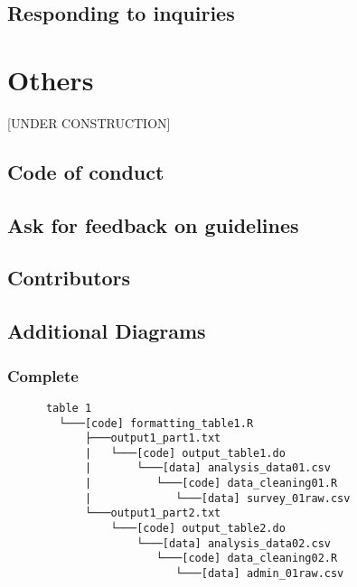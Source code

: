 \documentclass[]{book}
\begin{document}
\hypertarget{responding-to-inquiries}{%
\section{Responding to inquiries}\label{responding-to-inquiries}}

\hypertarget{others}{%
\chapter{Others}\label{others}}

{[}UNDER CONSTRUCTION{]}

\hypertarget{code-of-conduct}{%
\section{Code of conduct}\label{code-of-conduct}}

\hypertarget{ask-for-feedback-on-guidelines}{%
\section{Ask for feedback on guidelines}\label{ask-for-feedback-on-guidelines}}

\hypertarget{contributors}{%
\section{Contributors}\label{contributors}}

\hypertarget{additional-diagrams}{%
\section{Additional Diagrams}\label{additional-diagrams}}

\hypertarget{complete}{%
\subsection{Complete}\label{complete}}

\begin{verbatim}
      table 1
        └───[code] formatting_table1.R
            ├───output1_part1.txt  
            |   └───[code] output_table1.do           
            |       └───[data] analysis_data01.csv
            |          └───[code] data_cleaning01.R
            |             └───[data] survey_01raw.csv
            └───output1_part2.txt  
                └───[code] output_table2.do           
                    └───[data] analysis_data02.csv
                       └───[code] data_cleaning02.R
                          └───[data] admin_01raw.csv  
\end{verbatim}
\end{document}
